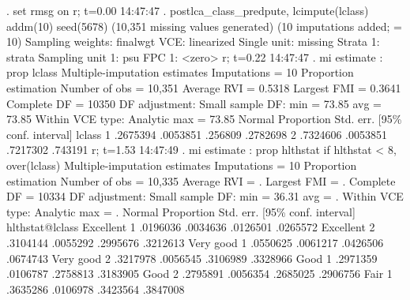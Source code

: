 . set rmsg on
r; t=0.00 14:47:47
{\smallskip}
. postlca_class_predpute, lcimpute(lclass) addm(10) seed(5678)
(10,351 missing values generated)
(10 imputations added; {} = 10)
{\smallskip}
Sampling weights: finalwgt
             VCE: linearized
     Single unit: missing
        Strata 1: strata
 Sampling unit 1: psu
           FPC 1: <zero>
r; t=0.22 14:47:47
{\smallskip}
. mi estimate : prop lclass
{\smallskip}
Multiple-imputation estimates     Imputations     =         10
Proportion estimation             Number of obs   =     10,351
                                  Average RVI     =     0.5318
                                  Largest FMI     =     0.3641
                                  Complete DF     =      10350
DF adjustment:   Small sample     DF:     min     =      73.85
                                          avg     =      73.85
Within VCE type:     Analytic             max     =      73.85
{\smallskip}
             {\VBAR}                                   Normal
             {\VBAR} Proportion   Std. err.     [95\% conf. interval]
      lclass {\VBAR}
          1  {\VBAR}   .2675394   .0053851       .256809    .2782698
          2  {\VBAR}   .7324606   .0053851      .7217302     .743191
r; t=1.53 14:47:49
{\smallskip}
. mi estimate : prop hlthstat if hlthstat < 8, over(lclass)
{\smallskip}
Multiple-imputation estimates     Imputations     =         10
Proportion estimation             Number of obs   =     10,335
                                  Average RVI     =          .
                                  Largest FMI     =          .
                                  Complete DF     =      10334
DF adjustment:   Small sample     DF:     min     =      36.31
                                          avg     =          .
Within VCE type:     Analytic             max     =          .
{\smallskip}
                {\VBAR}                                   Normal
                {\VBAR} Proportion   Std. err.     [95\% conf. interval]
hlthstat@lclass {\VBAR}
   Excellent 1  {\VBAR}   .0196036   .0034636      .0126501    .0265572
   Excellent 2  {\VBAR}   .3104144   .0055292      .2995676    .3212613
   Very good 1  {\VBAR}   .0550625   .0061217      .0426506    .0674743
   Very good 2  {\VBAR}   .3217978   .0056545      .3106989    .3328966
        Good 1  {\VBAR}   .2971359   .0106787      .2758813    .3183905
        Good 2  {\VBAR}   .2795891   .0056354      .2685025    .2906756
        Fair 1  {\VBAR}   .3635286   .0106978      .3423564    .3847008
